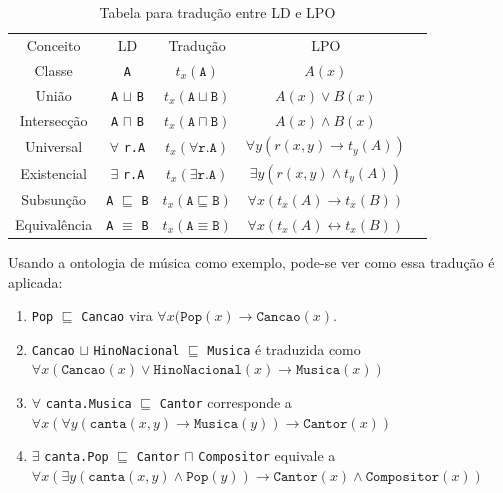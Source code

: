\begin{table}[H]
	\centering
	\begin{tabular}{|c|c|c|c|l}
		\cline{1-4}
		Conceito    & LD                                    & Tradução                                 & LPO                              &  \\ \cline{1-4}
		Classe      & \texttt{A}                            & $t_x(\texttt{A})$                        & $A(x)$                           &  \\ \cline{1-4}
		União       & \texttt{A} $ \sqcup $ \texttt{B}      & $t_x(\texttt{A} \sqcup \texttt{B})$      & $A(x) \lor B(x)$                 &  \\ \cline{1-4}
		Intersecção & \texttt{A} $ \sqcap $ \texttt{B}      & $t_x(\texttt{A} \sqcap \texttt{B})$      & $A(x) \land B(x)$                &  \\ \cline{1-4}
		Universal   & $\forall$ \texttt{r.A}                & $t_x(\forall \texttt{r.A})$              & $\forall y(r(x,y) \to t_y(A))$   &  \\ \cline{1-4}
		Existencial & $\exists$ \texttt{r.A}                & $t_x(\exists \texttt{r.A})$              & $\exists y(r(x,y) \land t_y(A))$ &  \\ \cline{1-4}
		Subsunção & \texttt{A} $ \sqsubseteq $ \texttt{B} & $t_x(\texttt{A} \sqsubseteq \texttt{B})$ & $\forall x(t_x(A) \to t_x(B))$   &  \\ \cline{1-4}
		Equivalência & \texttt{A} $ \equiv $ \texttt{B} & $t_x(\texttt{A} \equiv \texttt{B})$ & $\forall x(t_x(A) \longleftrightarrow t_x(B))$   &  \\ \cline{1-4}
	\end{tabular}
	\caption{Tabela para tradução entre LD e LPO}
\end{table}

Usando a ontologia de música como exemplo, pode-se ver como essa tradução é aplicada:

\begin{enumerate}
	\item \texttt{Pop} $ \sqsubseteq $ \texttt{Cancao} vira $\forall x(\texttt{Pop}(x) \to \texttt{Cancao}(x)$.
	\item \texttt{Cancao} $ \sqcup $ \texttt{HinoNacional} $ \sqsubseteq $ \texttt{Musica} é traduzida como $\forall x(\texttt{Cancao}(x) \lor \texttt{HinoNacional}(x) \to \texttt{Musica}(x))$
	\item $ \forall $ \texttt{canta.Musica} $ \sqsubseteq $ \texttt{Cantor} corresponde a $ \forall x(\forall y(\texttt{canta}(x,y) \to \texttt{Musica}(y)) \to \texttt{Cantor}(x)) $
	\item $ \exists $ \texttt{canta.Pop} $ \sqsubseteq $ \texttt{Cantor} $ \sqcap $ \texttt{Compositor} equivale a $ \forall x (\exists y(\texttt{canta}(x,y) \land \texttt{Pop}(y)) \to \texttt{Cantor}(x) \land \texttt{Compositor}(x))$
\end{enumerate}


